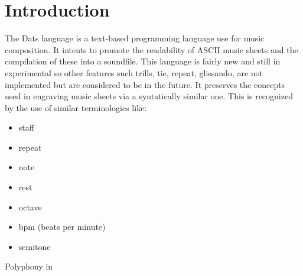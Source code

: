 \section{Introduction}
\renewcommand\frelo{\S\thesubsection}
\setcounter{page}{3}
\np The Dats language is a text-based programming language use for music composition.
It intents to promote the readability of ASCII music sheets and the compilation of these into
 a soundfile.
This language is fairly new and still in experimental so other features such trills, tie,
repeat, glissando, are not implemented but are considered to be in the future. It preserves the
concepts used in engraving music sheets via a syntatically similar one. This is
recognized by the use of similar terminologies like:

\begin{multicols}{2}
\begin{itemize}
\renewcommand{\labelitemi}{--}
\item staff
\item repeat
\item note
\item rest
\item octave
\item bpm (beats per minute)
\item semitone
\end{itemize}
\end{multicols}

\np Polyphony in
